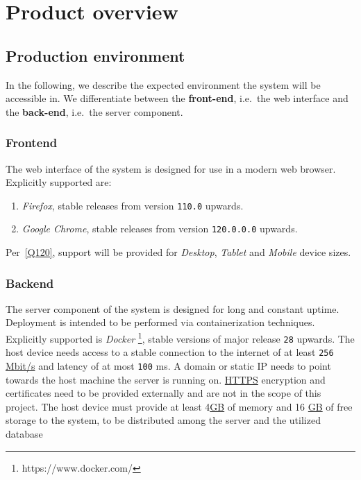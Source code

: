 

\chapter{Product overview}


\section{Production environment}
In the following, we describe the expected environment the system will be accessible in.
We differentiate between the \textbf{front-end}, i.e.\ the web interface and the \textbf{back-end}, i.e.\ the server component.

\subsection{Frontend}
The web interface of the system is designed for use in a modern web browser.
Explicitly supported are:
\begin{enumerate}
	\item \textit{Firefox}, stable releases from version \texttt{110.0} upwards.
	\item \textit{Google Chrome}, stable releases from version \texttt{120.0.0.0} upwards.
\end{enumerate}
Per~\ref{Q120}, support will be provided for \textit{Desktop}, \textit{Tablet} and \textit{Mobile} device sizes.

\subsection{Backend}
The server component of the system is designed for long and constant uptime. \newline
Deployment is intended to be performed via containerization techniques.
Explicitly supported is \textit{Docker} \footnote{https://www.docker.com/}, stable versions of major release \texttt{28} upwards. \newline
The host device needs access to a stable connection to the internet of at least \texttt{256} \hyperref[abr:Mbit/s]{Mbit/s} and latency of at most \texttt{100} ms. \newline
A domain or static IP needs to point towards the host machine the server is running on. \hyperref[abr:https]{HTTPS} encryption and certificates need to be provided externally and are not in the scope of this project. \newline
The host device must provide at least 4\hyperref[abr:GB]{GB} of memory and 16 \hyperref[abr:GB]{GB} of free storage to the system, to be distributed among the server and the utilized database

